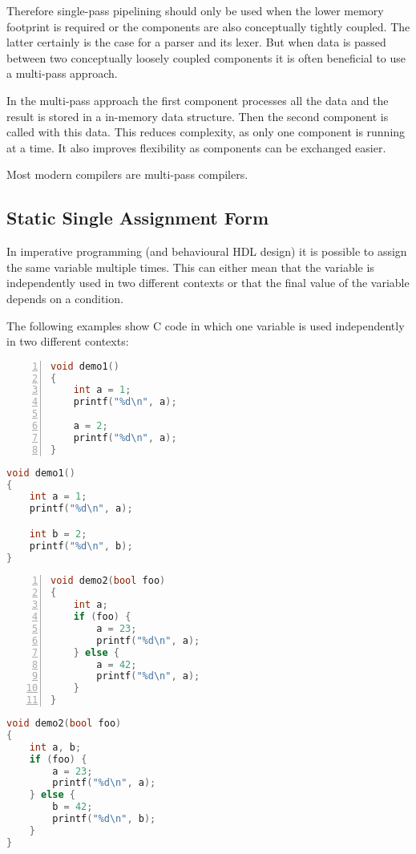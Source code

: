 Therefore single-pass pipelining should only be used when the lower memory footprint is required or the
components are also conceptually tightly coupled. The latter certainly is the case for a parser and its lexer.
But when data is passed between two conceptually loosely coupled components it is often
beneficial to use a multi-pass approach.

In the multi-pass approach the first component processes all the data and the result is stored in a in-memory
data structure. Then the second component is called with this data. This reduces complexity, as only one
component is running at a time. It also improves flexibility as components can be exchanged easier.

Most modern compilers are multi-pass compilers.

\iffalse
\subsection{Static Single Assignment Form}

In imperative programming (and behavioural HDL design) it is possible to assign the same variable multiple times.
This can either mean that the variable is independently used in two different contexts or that the final value
of the variable depends on a condition.

The following examples show C code in which one variable is used independently in two different contexts:

\begin{minipage}{7.7cm}
\begin{lstlisting}[numbers=left,frame=single,language=C++]
void demo1()
{
	int a = 1;
	printf("%d\n", a);

	a = 2;
	printf("%d\n", a);
}
\end{lstlisting}
\end{minipage}
\hfil
\begin{minipage}{7.7cm}
\begin{lstlisting}[frame=single,language=C++]
void demo1()
{
	int a = 1;
	printf("%d\n", a);

	int b = 2;
	printf("%d\n", b);
}
\end{lstlisting}
\end{minipage}

\begin{minipage}{7.7cm}
\begin{lstlisting}[numbers=left,frame=single,language=C++]
void demo2(bool foo)
{
	int a;
	if (foo) {
		a = 23;
		printf("%d\n", a);
	} else {
		a = 42;
		printf("%d\n", a);
	}
}
\end{lstlisting}
\end{minipage}
\hfil
\begin{minipage}{7.7cm}
\begin{lstlisting}[frame=single,language=C++]
void demo2(bool foo)
{
	int a, b;
	if (foo) {
		a = 23;
		printf("%d\n", a);
	} else {
		b = 42;
		printf("%d\n", b);
	}
}
\end{lstlisting}
\end{minipage}

